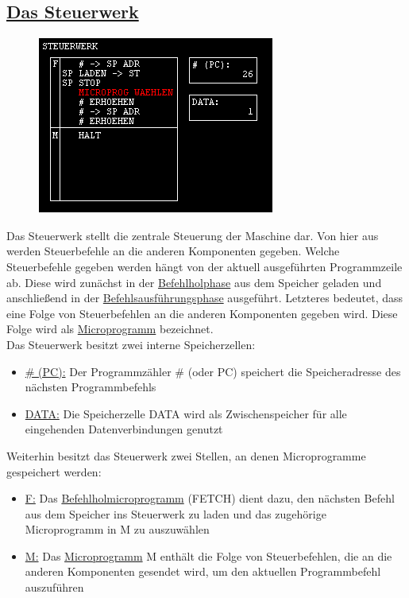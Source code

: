 \documentclass[a4paper,12pt]{article}
\begin{document}
\subsection*{\underline{Das Steuerwerk}}
\begin{figure}[h]
\centering
\includegraphics[scale=.75]{ControlUnit.png}
\end{figure}

Das Steuerwerk stellt die zentrale Steuerung der Maschine dar. Von hier aus werden Steuerbefehle an die anderen Komponenten gegeben. Welche Steuerbefehle gegeben werden hängt von der aktuell ausgeführten Programmzeile ab. Diese wird zunächst in der \underline{Befehlholphase} aus dem Speicher geladen und anschließend in der \underline{Befehlsausführungsphase} ausgeführt. Letzteres bedeutet, dass eine Folge von Steuerbefehlen an die anderen Komponenten gegeben wird. Diese Folge wird als \underline{Microprogramm} bezeichnet.\\
\newpage
Das Steuerwerk besitzt zwei interne Speicherzellen:
\begin{itemize}
\item \underline{\# (PC):} Der Programmzähler \# (oder PC) speichert die Speicheradresse des nächsten Programmbefehls
\item \underline{DATA:} Die Speicherzelle DATA wird als Zwischenspeicher für alle eingehenden Datenverbindungen genutzt
\end{itemize}
Weiterhin besitzt das Steuerwerk zwei Stellen, an denen Microprogramme gespeichert werden:
\begin{itemize}
\item \underline{F:} Das \underline{Befehlholmicroprogramm} (FETCH) dient dazu, den nächsten Befehl aus dem Speicher ins Steuerwerk zu laden und das zugehörige Microprogramm in M zu auszuwählen
\item \underline{M:} Das \underline{Microprogramm} M enthält die Folge von Steuerbefehlen, die an die anderen Komponenten gesendet wird, um den aktuellen Programmbefehl auszuführen
\end{itemize}
\end{document}

